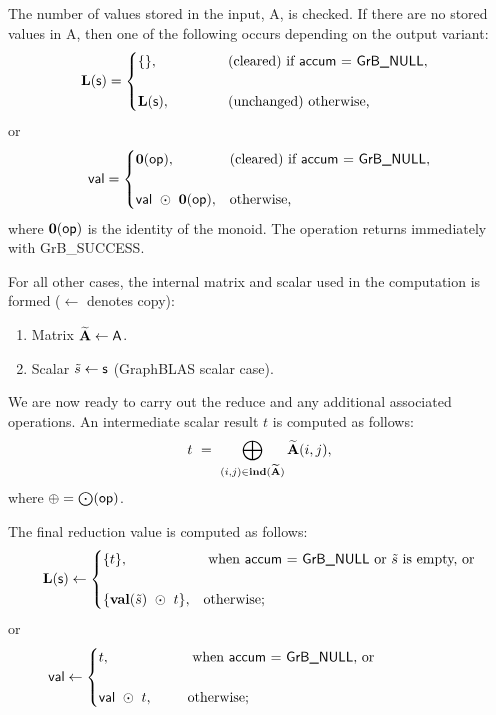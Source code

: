 The number of values stored in the input, {\sf A}, is checked.  If there are no stored values in {\sf A}, then one of the following occurs depending on the output variant:
\[ 
{\sf {\bf L}(s)} =
\begin{cases}
    \{\}, & \mbox{(cleared) if {\sf accum} = {\sf GrB\_NULL}}, ~~\\ & \\
    {\sf {\bf L}(s)}, ~~~ ~~~~~~~ & \mbox{(unchanged) otherwise,}
\end{cases}
\]
or
\[ 
{\sf val} =
\begin{cases}
    \bold{0}({\sf op}), & \mbox{(cleared) if {\sf accum} = {\sf GrB\_NULL}}, \\ & \\
    {\sf val} ~\odot~ {\bf 0}({\sf op}), & \mbox{otherwise,}
\end{cases}
\]
where $\bold{0}({\sf op})$ is the identity of the monoid. The operation returns immediately with {\sf GrB\_SUCCESS}.

For all other cases, the internal matrix and scalar used in 
the computation is formed ($\leftarrow$ denotes copy):
\begin{enumerate}
	\item Matrix ${\bf \widetilde{A}} \leftarrow {\sf A}$.
    \item Scalar ${\tilde{s}} \leftarrow {\sf s}$ (GraphBLAS scalar case).
\end{enumerate}

We are now ready to carry out the reduce and any additional associated operations.  
An intermediate scalar result $t$ is computed as follows:
\[ 
t ~ = ~
    \bigoplus\limits_{(i, j) \in \bold{ind}({\bf \widetilde{A}})} {\bf \widetilde{A}}(i, j),
\]
where $\oplus = \bigodot({\sf op})$.

The final reduction value is computed as follows:
\[
{\sf {\bf L}(s)} \leftarrow
    \begin{cases}
    \{ t \}, & \text{ when {\sf accum = GrB\_NULL} or ${\tilde{s}}$ is empty, or} \\ & \\
    \{ {\bf val}({\tilde{s}}) ~\odot ~ t \}, & \text{otherwise;} \\
    \end{cases}
\]
or 
\[
{\sf val} \leftarrow
    \begin{cases}
    t, & \text{ when {\sf accum = GrB\_NULL}, or} \hspace*{0.95in} \\ & \\
    {\sf val} ~\odot ~t, ~~~~~ & \text{otherwise;} \\
    \end{cases}
\]

